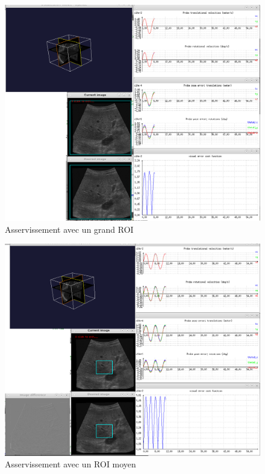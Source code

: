 \documentclass[a4paper,11pt]{article}
\begin{document}
\begin{figure}[H]
    \centering
    \includegraphics[width=0.5\textheight]{./images/q9_large.png}
    \caption{Asservissement avec un grand ROI}
    \label{largeRoi}
\end{figure}
\begin{figure}[H]
    \centering
    \includegraphics[width=0.5\textheight]{./images/q9_medium.png}
    \caption{Asservissement avec un ROI moyen}
    \label{mediumRoi}
\end{figure}
\end{document}
